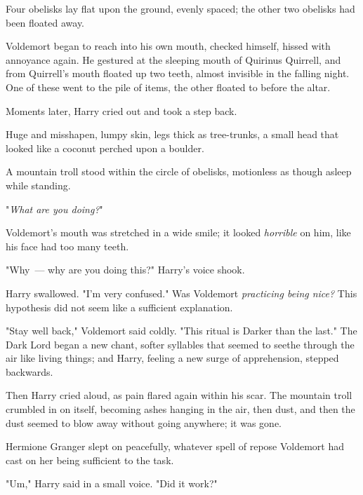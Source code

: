 Four obelisks lay flat upon the ground, evenly spaced; the other two obelisks
had been floated away.

Voldemort began to reach into his own mouth, checked himself, hissed with
annoyance again. He gestured at the sleeping mouth of Quirinus Quirrell, and
from Quirrell's mouth floated up two teeth, almost invisible in the falling
night. One of these went to the pile of items, the other floated to before the
altar.

Moments later, Harry cried out and took a step back.

Huge and misshapen, lumpy skin, legs thick as tree-trunks, a small head that
looked like a coconut perched upon a boulder.

A mountain troll stood within the circle of obelisks, motionless as though
asleep while standing.

"\emph{What are you doing?}"

Voldemort's mouth was stretched in a wide smile; it looked \emph{horrible} on
him, like his face had too many teeth. 

"Why~--- why are you doing this?" Harry's voice shook.


Harry swallowed. "I'm very confused." Was Voldemort \emph{practicing being
nice?} This hypothesis did not seem like a sufficient explanation.

"Stay well back," Voldemort said coldly. "This ritual is Darker than the last."
The Dark Lord began a new chant, softer syllables that seemed to seethe through
the air like living things; and Harry, feeling a new surge of apprehension,
stepped backwards.

Then Harry cried aloud, as pain flared again within his scar. The mountain
troll crumbled in on itself, becoming ashes hanging in the air, then dust, and
then the dust seemed to blow away without going anywhere; it was gone.

Hermione Granger slept on peacefully, whatever spell of repose Voldemort had
cast on her being sufficient to the task.

"Um," Harry said in a small voice. "Did it work?"


